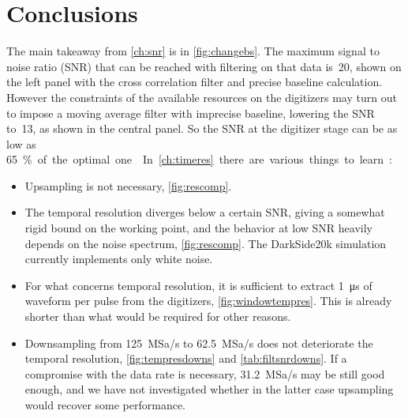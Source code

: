 \chapter{Conclusions}
\label{ch:end}

The main takeaway from \autoref{ch:snr} is in \autoref{fig:changebs}. The
maximum signal to noise ratio (SNR) that can be reached with filtering on that
data is~20, shown on the left panel with the cross correlation filter and
precise baseline calculation. However the constraints of the available
resources on the digitizers may turn out to impose a moving average filter with
imprecise baseline, lowering the SNR to~13, as shown in the central panel. So
the SNR at the digitizer stage can be as low as \SI{65}\% of the optimal one.


In \autoref{ch:timeres} there are various things to learn:

\begin{itemize}
    
    \item Upsampling is not necessary, \autoref{fig:rescomp}.
    
    \item The temporal resolution diverges below a certain SNR, giving a
    somewhat rigid bound on the working point, and the behavior at low SNR
    heavily depends on the noise spectrum, \autoref{fig:rescomp}. The
    DarkSide20k simulation currently implements only white noise.
    
    \item For what concerns temporal resolution, it is sufficient to extract
    \SI{1}{\micro s} of waveform per pulse from the digitizers,
    \autoref{fig:windowtempres}. This is already shorter than what would be
    required for other reasons.
    
    \item Downsampling from \SI{125}{MSa/s} to \SI{62.5}{MSa/s} does not
    deteriorate the temporal resolution, \autoref{fig:tempresdowns} and
    \autoref{tab:filtsnrdowns}. If a compromise with the data rate is
    necessary, \SI{31.2}{MSa/s} may be still good enough, and we have not
    investigated whether in the latter case upsampling would recover some
    performance.
    
\end{itemize}


